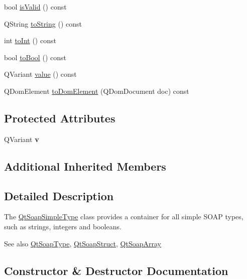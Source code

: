 \begin{DoxyCompactItemize}
\item 
bool \mbox{\hyperlink{class_qt_soap_simple_type_aa02758d143c6027bc15a2712e241795c}{is\+Valid}} () const
\item 
Q\+String \mbox{\hyperlink{class_qt_soap_simple_type_aeb17c8605fc09bcde232f11a6f91f775}{to\+String}} () const
\item 
int \mbox{\hyperlink{class_qt_soap_simple_type_a3308ce664e671f234e2f3a508d858b48}{to\+Int}} () const
\item 
bool \mbox{\hyperlink{class_qt_soap_simple_type_ae66188ecb3501673471e4fa1a754ef33}{to\+Bool}} () const
\item 
Q\+Variant \mbox{\hyperlink{class_qt_soap_simple_type_aca629cc16e84fcfa083799c756e865db}{value}} () const
\item 
Q\+Dom\+Element \mbox{\hyperlink{class_qt_soap_simple_type_a85fb947fe3abe23c48a08a0d4f82604e}{to\+Dom\+Element}} (Q\+Dom\+Document doc) const
\end{DoxyCompactItemize}
\subsection*{Protected Attributes}
\begin{DoxyCompactItemize}
\item 
\mbox{\label{class_qt_soap_simple_type_a7a4d3e1b3ba9dad7c26b1e1159fc9281}} 
Q\+Variant {\bfseries v}
\end{DoxyCompactItemize}
\subsection*{Additional Inherited Members}


\subsection{Detailed Description}
The \mbox{\hyperlink{class_qt_soap_simple_type}{Qt\+Soap\+Simple\+Type}} class provides a container for all simple S\+O\+AP types, such as strings, integers and booleans. 

\begin{DoxySeeAlso}{See also}
\mbox{\hyperlink{class_qt_soap_type}{Qt\+Soap\+Type}}, \mbox{\hyperlink{class_qt_soap_struct}{Qt\+Soap\+Struct}}, \mbox{\hyperlink{class_qt_soap_array}{Qt\+Soap\+Array}} 
\end{DoxySeeAlso}


\subsection{Constructor \& Destructor Documentation}
\mbox{\label{class_qt_soap_simple_type_ab0d80dc82ccc45e589d92f6d0dd95f94}} 
